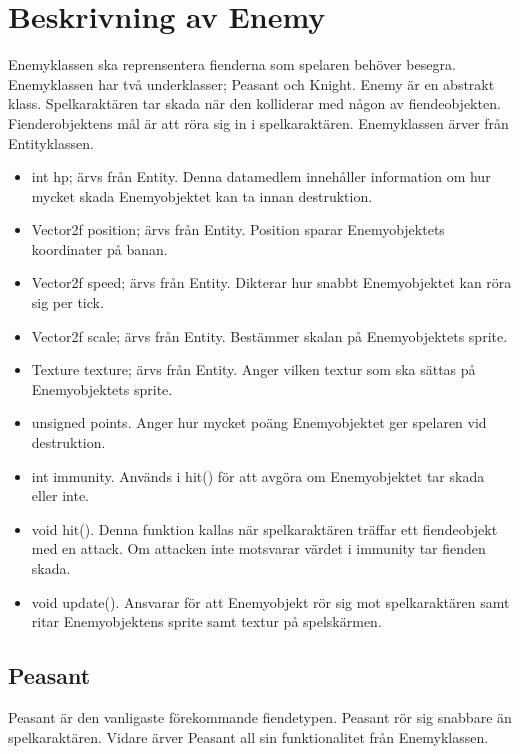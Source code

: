 \documentclass{TDP005mall}
\begin{document}
\section{Beskrivning av Enemy}
Enemyklassen ska reprensentera fienderna som spelaren behöver besegra. 
Enemyklassen har två underklasser; Peasant och Knight.
Enemy är en abstrakt klass. 
Spelkaraktären tar skada när den kolliderar med någon av fiendeobjekten. 
Fienderobjektens mål är att röra sig in i spelkaraktären. 
Enemyklassen ärver från Entityklassen.
\begin{itemize}
\item int hp; ärvs från Entity. Denna datamedlem innehåller information om hur mycket skada Enemyobjektet kan ta innan destruktion.
\item Vector2f position; ärvs från Entity. Position sparar Enemyobjektets koordinater på banan.
\item Vector2f speed; ärvs från Entity. Dikterar hur snabbt Enemyobjektet kan röra sig per tick.
\item Vector2f scale; ärvs från Entity. Bestämmer skalan på Enemyobjektets sprite.
\item Texture texture; ärvs från Entity. Anger vilken textur som ska sättas på Enemyobjektets sprite.
\item unsigned points. Anger hur mycket poäng Enemyobjektet ger spelaren vid destruktion.
\item int immunity. Används i hit() för att avgöra om Enemyobjektet tar skada eller inte.
\item void hit(). Denna funktion kallas när spelkaraktären träffar ett fiendeobjekt med en attack. Om attacken inte motsvarar värdet i immunity tar fienden skada.
\item void update(). Ansvarar för att Enemyobjekt rör sig mot spelkaraktären samt ritar Enemyobjektens sprite samt textur på spelskärmen.
\end{itemize}
\subsection{Peasant}
Peasant är den vanligaste förekommande fiendetypen. 
Peasant rör sig snabbare än spelkaraktären.
Vidare ärver Peasant all sin funktionalitet från Enemyklassen.
\end{document}
